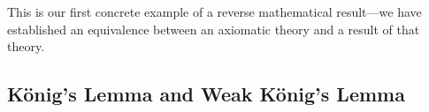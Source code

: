 \documentclass{amsart}
\begin{document}
	This is our first concrete example of a reverse mathematical result---we have established an equivalence between an axiomatic theory and a result of that theory.
	
	
	
	
	
		
		
	
	
	
	
	
	\subsection{K\"onig's Lemma and Weak K\"onig's Lemma}
	
\end{document}
